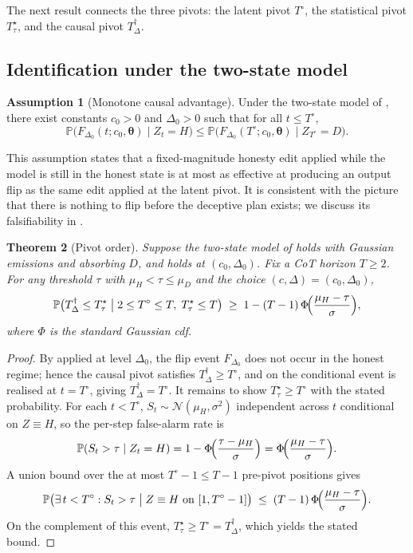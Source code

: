 \documentclass[11pt]{article}
\newtheorem{theorem}{Theorem}[section]
\theoremstyle{definition}
\newtheorem{assumption}[theorem]{Assumption}
\newcommand{\Prob}{\mathbb{P}}
\newcommand{\1}{\mathbf{1}}
\newcommand{\thetab}{\bm{\theta}}
\begin{document}
The next result connects the three pivots: the latent pivot $T^{\circ}$, the statistical pivot $T^{\star}_{\tau}$, and the causal pivot $T^{\dagger}_{\Delta}$.

\subsection{Identification under the two-state model}

\begin{assumption}[Monotone causal advantage]
\label{ass:monotone}
Under the two-state model of , there exist constants $c_0 > 0$ and $\Delta_0 > 0$ such that for all $t \le T^{\circ}$,
\[
\Prob\bigl(F_{\Delta_0}(t; c_0, \thetab) \mid Z_t = H\bigr) \le \Prob\bigl(F_{\Delta_0}(T^{\circ}; c_0, \thetab) \mid Z_{T^{\circ}} = D\bigr).
\]
\end{assumption}

This assumption states that a fixed-magnitude honesty edit applied while the model is still in the honest state is at most as effective at producing an output flip as the same edit applied at the latent pivot. It is consistent with the picture that there is nothing to flip before the deceptive plan exists; we discuss its falsifiability in .

\begin{theorem}[Pivot order]
\label{thm:pivot-order}
Suppose the two-state model of  holds with Gaussian emissions and absorbing $D$, and  holds at $(c_0, \Delta_0)$. Fix a CoT horizon $T \ge 2$. For any threshold $\tau$ with $\mu_H < \tau \le \mu_D$ and the choice $(c, \Delta) = (c_0, \Delta_0)$,
\[
\Prob\bigl(T^{\dagger}_{\Delta} \le T^{\star}_{\tau} \bigm| 2 \le T^{\circ} \le T,\; T^{\star}_{\tau} \le T\bigr) \;\ge\; 1 - (T - 1)\, \Phi\!\Bigl(\frac{\mu_H - \tau}{\sigma}\Bigr),
\]
where $\Phi$ is the standard Gaussian cdf.
\end{theorem}

\begin{proof}
By  applied at level $\Delta_0$, the flip event $F_{\Delta_0}$ does not occur in the honest regime; hence the causal pivot satisfies $T^{\dagger}_{\Delta} \ge T^{\circ}$, and on the conditional event  is realised at $t = T^{\circ}$, giving $T^{\dagger}_{\Delta} = T^{\circ}$. It remains to show $T^{\star}_{\tau} \ge T^{\circ}$ with the stated probability. For each $t < T^{\circ}$, $S_t \sim \mathcal{N}(\mu_H, \sigma^2)$ independent across $t$ conditional on $Z \equiv H$, so the per-step false-alarm rate is
\[
\Prob(S_t > \tau \mid Z_t = H) = 1 - \Phi\!\Bigl(\frac{\tau - \mu_H}{\sigma}\Bigr) = \Phi\!\Bigl(\frac{\mu_H - \tau}{\sigma}\Bigr).
\]
A union bound over the at most $T^{\circ} - 1 \le T - 1$ pre-pivot positions gives
\[
\Prob\bigl(\exists\, t < T^{\circ} : S_t > \tau \bigm| Z \equiv H \text{ on } [1, T^{\circ}-1]\bigr) \;\le\; (T - 1)\, \Phi\!\Bigl(\frac{\mu_H - \tau}{\sigma}\Bigr).
\]
On the complement of this event, $T^{\star}_{\tau} \ge T^{\circ} = T^{\dagger}_{\Delta}$, which yields the stated bound.
\end{proof}
\end{document}
